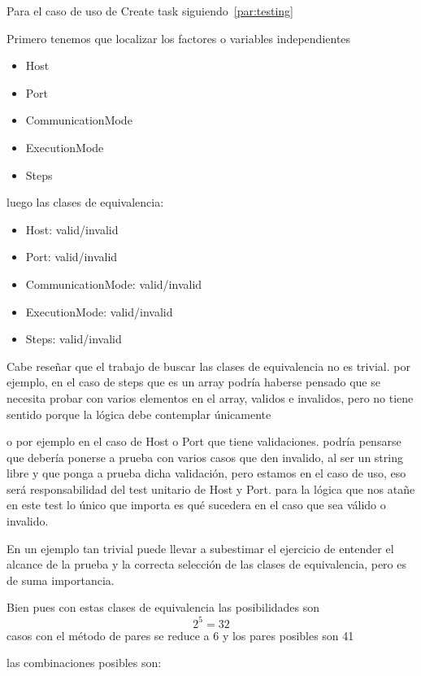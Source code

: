 Para el caso de uso de Create task siguiendo~\cref{par:testing}

Primero tenemos que localizar los factores o variables independientes

\begin{itemize}
    \item Host
    \item Port
    \item CommunicationMode
    \item ExecutionMode
    \item Steps
\end{itemize}

luego las clases de equivalencia:

\begin{itemize}
    \item Host: valid/invalid
    \item Port: valid/invalid
    \item CommunicationMode: valid/invalid
    \item ExecutionMode: valid/invalid
    \item Steps: valid/invalid
\end{itemize}

Cabe reseñar que el trabajo de buscar las clases de equivalencia no es trivial. por ejemplo, en el caso de steps que es un array podría haberse pensado que se necesita probar con varios elementos en el array, validos e invalidos, pero no tiene sentido porque la lógica debe contemplar únicamente

o por ejemplo en el caso de Host o Port que tiene validaciones. podría pensarse que debería ponerse a prueba con varios casos que den invalido, al ser un string libre y que ponga a prueba dicha validación, pero estamos en el caso de uso, eso será responsabilidad del test unitario de Host y Port. para la lógica que nos atañe en este test lo único que importa es qué sucedera en el caso que sea válido o invalido.

En un ejemplo tan trivial puede llevar a subestimar el ejercicio de entender el alcance de la prueba y la correcta selección de las clases de equivalencia, pero es de suma importancia.

Bien pues con estas clases de equivalencia las posibilidades son \[ 2^5 = 32 \] casos con el método de pares se reduce a 6 y los pares posibles son 41

las combinaciones posibles son:

